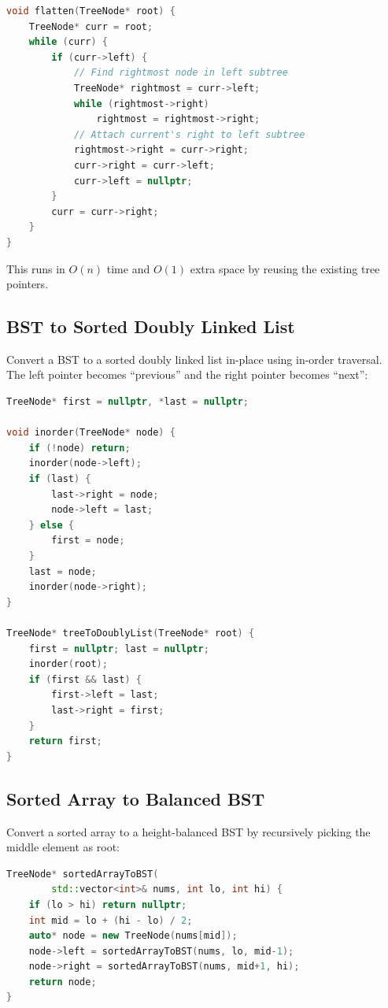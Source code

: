 \begin{lstlisting}[language=C++]
void flatten(TreeNode* root) {
    TreeNode* curr = root;
    while (curr) {
        if (curr->left) {
            // Find rightmost node in left subtree
            TreeNode* rightmost = curr->left;
            while (rightmost->right)
                rightmost = rightmost->right;
            // Attach current's right to left subtree
            rightmost->right = curr->right;
            curr->right = curr->left;
            curr->left = nullptr;
        }
        curr = curr->right;
    }
}
\end{lstlisting}

This runs in $O(n)$ time and $O(1)$ extra space by reusing the existing tree pointers.

\subsection{BST to Sorted Doubly Linked List}

Convert a BST to a sorted doubly linked list in-place using in-order traversal. The left pointer becomes ``previous'' and the right pointer becomes ``next'':

\begin{lstlisting}[language=C++]
TreeNode* first = nullptr, *last = nullptr;

void inorder(TreeNode* node) {
    if (!node) return;
    inorder(node->left);
    if (last) {
        last->right = node;
        node->left = last;
    } else {
        first = node;
    }
    last = node;
    inorder(node->right);
}

TreeNode* treeToDoublyList(TreeNode* root) {
    first = nullptr; last = nullptr;
    inorder(root);
    if (first && last) {
        first->left = last;
        last->right = first;
    }
    return first;
}
\end{lstlisting}

\subsection{Sorted Array to Balanced BST}

Convert a sorted array to a height-balanced BST by recursively picking the middle element as root:

\begin{lstlisting}[language=C++]
TreeNode* sortedArrayToBST(
        std::vector<int>& nums, int lo, int hi) {
    if (lo > hi) return nullptr;
    int mid = lo + (hi - lo) / 2;
    auto* node = new TreeNode(nums[mid]);
    node->left = sortedArrayToBST(nums, lo, mid-1);
    node->right = sortedArrayToBST(nums, mid+1, hi);
    return node;
}
\end{lstlisting}

